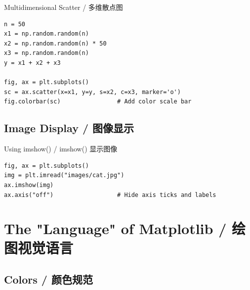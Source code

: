 \documentclass[11pt,a4paper]{report}
\begin{document}
\begin{examplebox}{Multidimensional Scatter / 多维散点图}
\begin{lstlisting}
n = 50
x1 = np.random.random(n)
x2 = np.random.random(n) * 50
x3 = np.random.random(n)
y = x1 + x2 + x3

fig, ax = plt.subplots()
sc = ax.scatter(x=x1, y=y, s=x2, c=x3, marker='o')
fig.colorbar(sc)                # Add color scale bar
\end{lstlisting}
\end{examplebox}

\subsection{Image Display / 图像显示}

\begin{examplebox}{Using imshow() / imshow() 显示图像}
\begin{lstlisting}
fig, ax = plt.subplots()
img = plt.imread("images/cat.jpg")
ax.imshow(img)
ax.axis("off")                  # Hide axis ticks and labels
\end{lstlisting}
\end{examplebox}

\section{The "Language" of Matplotlib / 绘图视觉语言}

\subsection{Colors / 颜色规范}
\end{document}
